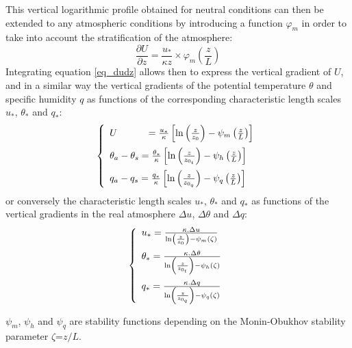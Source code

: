 This vertical logarithmic profile obtained for neutral conditions can then be extended to any atmospheric conditions by introducing 
a function ${\varphi}_m$ in order to take into account the stratification of the atmosphere:
\begin{equation}
	\frac{\partial U}{\partial z}=\frac{u_{*}}{\kappa z}\times {\varphi}_m\left(\frac{z}{L}\right)
\label{eq_dudz}\end{equation}
Integrating equation \ref{eq_dudz} allows then to express the vertical gradient of $U$, 
and in a similar way the vertical gradients of the potential temperature $\theta$ and specific humidity $q$
as functions of the corresponding characteristic length scales $u_*$, ${\theta}_*$ and $q_*$:
\begin{equation}
\left\{
\begin{array}{l}
\vspace*{0.2 cm}
	U~~~~~~~~~=\frac{u_{*}}{\kappa}\left[\ln\left(\frac{z}{z_0}\right)-{\psi}_m\left(\frac{z}{L}\right)\right]\\
\vspace*{0.2 cm}
	\theta_{a}- \theta_{s}=\frac{{\theta}_{*}}{\kappa}\left[\ln\left(\frac{z}{z_{0_t}}\right)-{\psi}_h\left(\frac{z}{L}\right)\right]\\
	q_{a}- q_{s}=\frac{q_{*}}{\kappa}\left[\ln\left(\frac{z}{z_{0_q}}\right)-{\psi}_q\left(\frac{z}{L}\right)\right]
\end{array}
\right.
\label{eq_gradutq}\end{equation}
or conversely the characteristic length scales $u_*$, ${\theta}_*$ and $q_*$ as functions of the vertical gradients
in the real atmosphere $\Delta u$, $\Delta \theta$ and $\Delta q$:
\begin{equation}
\left\{
\begin{array}{l}
\vspace*{0.2 cm}
	u_{*}=\frac{{\kappa}.\Delta u}{\ln\left(\frac{z}{z_0}\right)-{\psi}_m(\zeta)}\\
\vspace*{0.2 cm}
	\theta_{*}=\frac{{\kappa}.\Delta \theta}{\ln\left(\frac{z}{z_{0_t}}\right)-{\psi}_h(\zeta)}\\
	q_{*}=\frac{{\kappa}.\Delta q}{\ln\left(\frac{z}{z_{0_q}}\right)-{\psi}_q(\zeta)}
\end{array}
\right.
\label{allstars}\end{equation}

${\psi}_m$, ${\psi}_h$ and ${\psi}_q$ are stability functions depending on the Monin-Obukhov stability parameter $\zeta$=$z/L$.

